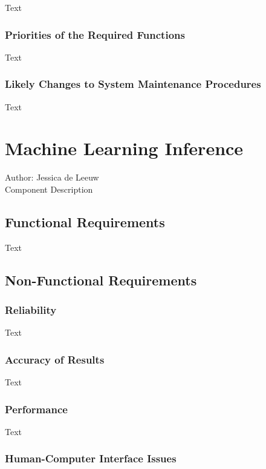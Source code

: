 \documentclass[12pt]{article}
\begin{document}
Text

\subsubsection {Priorities of the Required Functions}

Text

\subsubsection {Likely Changes to System Maintenance Procedures}

Text

\section{Machine Learning Inference}
Author: Jessica de Leeuw\\

\noindent Component Description

\subsection{Functional Requirements}

Text

\subsection{Non-Functional Requirements}

\subsubsection {Reliability}

Text

\subsubsection {Accuracy of Results}
 
Text

\subsubsection {Performance}

Text

\subsubsection {Human-Computer Interface Issues}
\end{document}
